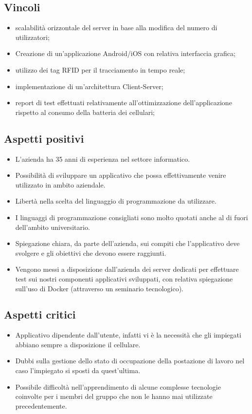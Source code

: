 \subsection{Vincoli}{
\begin{itemize}
\item scalabilità orizzontale del server in base alla modifica del numero di utilizzatori;
\item Creazione di un'applicazione Android/iOS con relativa interfaccia grafica;
\item utilizzo dei tag RFID per il tracciamento in tempo reale;

\item implementazione di un'architettura Client-Server;
\item report di test effettuati relativamente all'ottimizzazione dell'applicazione rispetto al consumo della
batteria dei cellulari;
\end{itemize}
}

\subsection{Aspetti positivi}{
\begin{itemize}
\item L'azienda ha 35 anni di esperienza nel settore informatico.
\item Possibilità di sviluppare un applicativo che possa effettivamente venire utilizzato in ambito aziendale.
\item Libertà nella scelta del linguaggio di programmazione da utilizzare.
\item I linguaggi di programmazione consigliati sono molto quotati anche al di fuori dell'ambito universitario.
\item Spiegazione chiara, da parte dell’azienda, sui compiti che l'applicativo deve svolgere e gli obiettivi che devono essere raggiunti.
\item Vengono messi a disposizione dall'azienda dei server dedicati per effettuare test sui nostri componenti applicativi sviluppati, con relativa spiegazione sull'uso di Docker (attraverso un seminario tecnologico).
\end{itemize}
}

\subsection{Aspetti critici}{
\begin{itemize}
\item Applicativo dipendente dall'utente, infatti vi è la necessità che gli impiegati abbiano sempre a disposizione il cellulare.
\item Dubbi sulla gestione dello stato di occupazione della postazione di lavoro nel caso l'impiegato si sposti da quest'ultima.
\item Possibile difficoltà nell’apprendimento di alcune complesse tecnologie coinvolte per i membri del gruppo che non le hanno mai utilizzate precedentemente.
\end{itemize}
}

